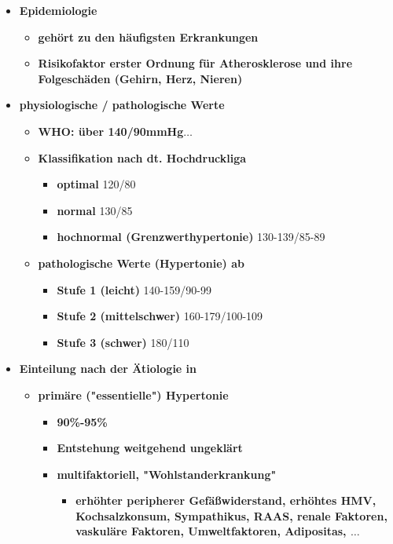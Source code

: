 		\begin{itemize}
			\item \textbf{Epidemiologie}
				\begin{itemize}
					\item \textbf{gehört zu den häufigsten Erkrankungen}
					\item \textbf{Risikofaktor erster Ordnung für Atherosklerose und ihre Folgeschäden (Gehirn, Herz, Nieren)}
				\end{itemize}
			\item \textbf{physiologische / pathologische Werte}
				\begin{itemize}
					\item \textbf{WHO: über 140/90mmHg$\dots$}
					\item \textbf{Klassifikation nach dt. Hochdruckliga}
						\begin{itemize}
							\item \textbf{optimal} 120/80
							\item \textbf{normal} 130/85
							\item \textbf{hochnormal (Grenzwerthypertonie)} 130-139/85-89
						\end{itemize}
					\item \textbf{pathologische Werte (Hypertonie) ab}
						\begin{itemize}
							\item \textbf{Stufe 1 (leicht)} 140-159/90-99
							\item \textbf{Stufe 2 (mittelschwer)} 160-179/100-109
							\item \textbf{Stufe 3 (schwer)} 180/110
						\end{itemize}
				\end{itemize}
			\item \textbf{Einteilung nach der Ätiologie in}
				\begin{itemize}
					\item \textbf{primäre ("essentielle") Hypertonie}
						\begin{itemize}
							\item \textbf{90\%-95\%}
							\item \textbf{Entstehung weitgehend ungeklärt}
							\item \textbf{multifaktoriell, "Wohlstanderkrankung"}
								\begin{itemize}
									\item \textbf{erhöhter peripherer Gefäßwiderstand, erhöhtes HMV, Kochsalzkonsum, Sympathikus, RAAS, renale Faktoren, vaskuläre Faktoren, Umweltfaktoren, Adipositas, $\dots$}
								\end{itemize}
						\end{itemize}
						

\end{itemize}
\end{itemize}
